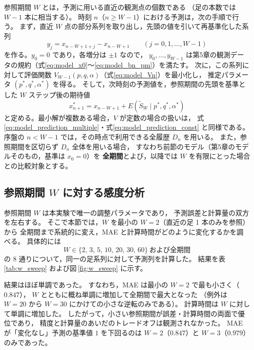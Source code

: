 \documentclass[a4j,dvipdfmx]{jsarticle}
\theoremstyle{plainnote}
\begin{document}
参照期間 $W$ とは，予測に用いる直近の観測点の個数である
（足の本数では $W-1$ 本に相当する）。
時刻 $n$（$n\geq W-1$）における予測は，次の手順で行う。
まず，直近 $W$ 点の部分系列を取り出し，先頭の値を引いて再基準化した系列
\begin{equation}
  y_j=x_{n-W+1+j}-x_{n-W+1}
  \qquad (j=0,1,\ldots,W-1)
  \label{eq:rolling_rezero}
\end{equation}
を作る。$y_0=0$ であり，各増分は $\pm1$ なので，
$y_0,\ldots,y_{W-1}$ は第5章の観測データの規約（式\eqref{eq:model_x0}〜\eqref{eq:model_bn_pm}）を満たす。
次に，この系列に対して評価関数 $V_{W-1}(p,q,\alpha)$（式\eqref{eq:model_Vn}）を最小化し，
推定パラメータ $(p^\ast,q^\ast,\alpha^\ast)$ を得る。
そして，次時刻の予測値を，参照期間の先頭を基準とした $W$ ステップ後の期待値
\begin{equation}
  x_{n+1}^{\ast}
  =
  x_{n-W+1}
  +
  E(\tilde{S}_{W}\mid p^\ast,q^\ast,\alpha^\ast)
  \label{eq:rolling_prediction}
\end{equation}
と定める。最小解が複数ある場合，$V$ が定数の場合の扱いは，
式\eqref{eq:model_prediction_multiple}・式\eqref{eq:model_prediction_const} と同様である。
序盤の $n<W-1$ では，その時点で利用できる全履歴 $D_n$ を用いる。
また，参照期間を区切らず $D_n$ 全体を用いる場合，
すなわち前節のモデル（第5章のモデルそのもの，基準は $x_0=0$）を
\textbf{全期間}とよび，以降では $W$ を有限にとった場合との比較対象とする。

\subsection{参照期間 $W$ に対する感度分析}\label{subsec:w_sweep}

参照期間 $W$ は本実験で唯一の調整パラメータであり，
予測誤差と計算量の双方を左右する。
そこで本節では，$W$ を最小の $W=2$（直近の足 1 本のみを参照）から
全期間まで系統的に変え，MAE と計算時間がどのように変化するかを調べる。
具体的には
\[
  W\in\{2,\,3,\,5,\,10,\,20,\,30,\,60\}\ \text{および全期間}
\]
の 8 通りについて，同一の足系列に対して予測列を計算した。
結果を表\,\ref{tab:w_sweep} および図\,\ref{fig:w_sweep} に示す。

結果はほぼ単調であった。
すなわち，MAE は最小の $W=2$ で最も小さく（$0.847$），
$W$ とともに概ね単調に増加して全期間で最大となった
（例外は $W=20$ から $W=30$ にかけての小さな逆転のみである）。
計算時間は $W$ に対して単調に増加した。
したがって，小さい参照期間が誤差・計算時間の両面で優位であり，
精度と計算量のあいだのトレードオフは観測されなかった。
MAE が「変化なし」予測の基準値 $1$ を下回るのは $W=2$（$0.847$）と
$W=3$（$0.979$）のみであった。
\end{document}
